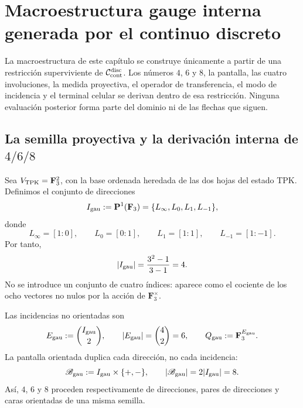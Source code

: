 \iffalse
\chapter[Macroestructura gauge interna]{Macroestructura gauge interna generada por el continuo discreto}
\label{chap:gauint-macroestructura}

\begin{thesisbox}
La macroestructura de este capítulo se construye únicamente a partir de una
restricción superviviente de \(\mathcal C_{\rm cont}^{\rm disc}\). Los números
\(4\), \(6\) y \(8\), la pantalla, las cuatro involuciones, la medida
proyectiva, el operador de transferencia, el modo de incidencia y el terminal
celular se derivan dentro de esa restricción. Ninguna evaluación posterior
forma parte del dominio ni de las flechas que siguen.
\end{thesisbox}

\section{La semilla proyectiva y la derivación interna de \texorpdfstring{\(4/6/8\)}{4/6/8}}

Sea \(V_{\rm TPK}=\mathbf F_3^2\), con la base ordenada heredada de las dos
hojas del estado TPK. Definimos el conjunto de direcciones
\begin{equation}\label{eq:gauint-cuatro-direcciones}
 I_{\rm gau}:=\mathbf P^1(\mathbf F_3)
 =\{L_\infty,L_0,L_1,L_{-1}\},
\end{equation}
donde
\[
 L_\infty=[1:0],\qquad L_0=[0:1],\qquad
 L_1=[1:1],\qquad L_{-1}=[1:-1].
\]
Por tanto,
\begin{equation}\label{eq:gauint-cardinal-cuatro}
 |I_{\rm gau}|=\frac{3^2-1}{3-1}=4.
\end{equation}
No se introduce un conjunto de cuatro índices: aparece como el cociente de
los ocho vectores no nulos por la acción de \(\mathbf F_3^\times\).

Las incidencias no orientadas son
\begin{equation}\label{eq:gauint-seis-incidencias}
 E_{\rm gau}:=\binom{I_{\rm gau}}2,
 \qquad |E_{\rm gau}|=\binom42=6,
 \qquad Q_{\rm gau}:=\mathbf F_3^{E_{\rm gau}}.
\end{equation}
La pantalla orientada duplica cada dirección, no cada incidencia:
\begin{equation}\label{eq:gauint-ocho-caras}
 \mathscr B_{\rm gau}:=I_{\rm gau}\times\{+,-\},
 \qquad |\mathscr B_{\rm gau}|=2|I_{\rm gau}|=8.
\end{equation}
Así, \(4\), \(6\) y \(8\) proceden respectivamente de direcciones, pares de
direcciones y caras orientadas de una misma semilla.

